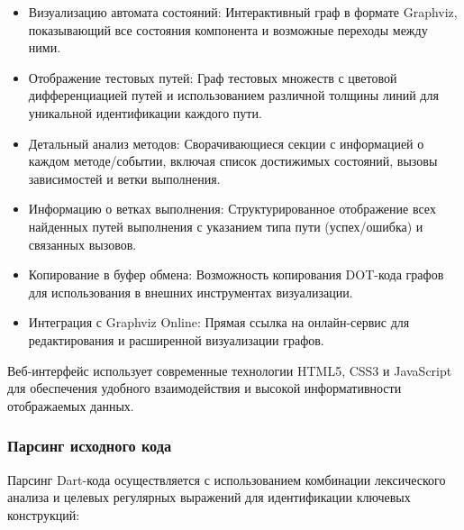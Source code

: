 \documentclass[14pt, russian]{scrartcl}
\begin{document}
\begin{itemize}
    \item Визуализацию автомата состояний: Интерактивный граф в формате Graphviz, показывающий все состояния компонента и возможные переходы между ними.
    \item Отображение тестовых путей: Граф тестовых множеств с цветовой дифференциацией путей и использованием различной толщины линий для уникальной идентификации каждого пути.
    \item Детальный анализ методов: Сворачивающиеся секции с информацией о каждом методе/событии, включая список достижимых состояний, вызовы зависимостей и ветки выполнения.
    \item Информацию о ветках выполнения: Структурированное отображение всех найденных путей выполнения с указанием типа пути (успех/ошибка) и связанных вызовов.
    \item Копирование в буфер обмена: Возможность копирования DOT-кода графов для использования в внешних инструментах визуализации.
    \item Интеграция с Graphviz Online: Прямая ссылка на онлайн-сервис для редактирования и расширенной визуализации графов.
\end{itemize}

Веб-интерфейс использует современные технологии HTML5, CSS3 и JavaScript для обеспечения удобного взаимодействия и высокой информативности отображаемых данных.

\subsubsection{Парсинг исходного кода}
Парсинг Dart-кода осуществляется с использованием комбинации лексического анализа и целевых регулярных выражений для идентификации ключевых конструкций:
\end{document}

